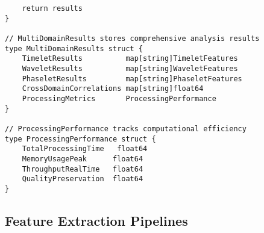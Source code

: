 \begin{tcolorbox}[colback=CodeBackground, colframe=DarkGray, title=Video-Audio Dataset Processing, fonttitle=\bfseries]
\begin{verbatim}
    return results
}

// MultiDomainResults stores comprehensive analysis results
type MultiDomainResults struct {
    TimeletResults          map[string]TimeletFeatures
    WaveletResults          map[string]WaveletFeatures
    PhaseletResults         map[string]PhaseletFeatures
    CrossDomainCorrelations map[string]float64
    ProcessingMetrics       ProcessingPerformance
}

// ProcessingPerformance tracks computational efficiency
type ProcessingPerformance struct {
    TotalProcessingTime   float64
    MemoryUsagePeak      float64
    ThroughputRealTime   float64
    QualityPreservation  float64
}
\end{verbatim}
\end{tcolorbox}

\subsection{Feature Extraction Pipelines}


